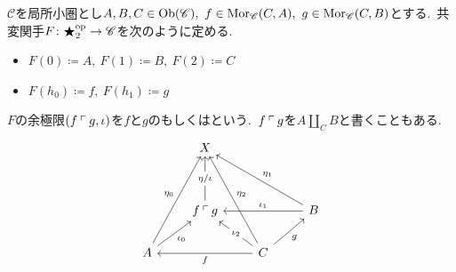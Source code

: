 \begin{definition} \label{def: pushout}
$\mathscr{C}$を局所小圏とし$A, B, C \in \operatorname{Ob}(\mathscr{C}),\ f \in \operatorname{Mor}_{\mathscr{C}}(C, A),\ g \in \operatorname{Mor}_{\mathscr{C}}(C, B)$とする.\
共変関手$F \colon \bigstar_2^{\operatorname{op}} \to \mathscr{C}$を次のように定める.\
\begin{itemize}
	\item $F(0) \coloneq A,\ F(1) \coloneq B,\ F(2) \coloneq C$
	\item $F(h_0) \coloneq f,\ F(h_1) \coloneq g$
\end{itemize}
$F$の余極限$(f \mathbin{\ulcorner} g, \iota)$を$f$と$g$のもしくはという.\
$f \mathbin{\ulcorner} g$を$A \amalg_C B$と書くこともある.\
\[\begin{tikzcd}
	& X && \\
	\\
	& {f \po g} && B \\
	A && C
	\arrow["{\eta / \iota}"{description}, from=3-2, to=1-2]
	\arrow["{\eta_1}"', from=3-4, to=1-2]
	\arrow["{\iota_1}"', from=3-4, to=3-2]
	\arrow["{\eta_0}", from=4-1, to=1-2]
	\arrow["{\iota_0}"', from=4-1, to=3-2]
	\arrow["{\eta_2}"', from=4-3, to=1-2]
	\arrow["{\iota_2}"{description}, from=4-3, to=3-2]
	\arrow["g"', from=4-3, to=3-4]
	\arrow["f", from=4-3, to=4-1]
\end{tikzcd}\]
\end{definition}

